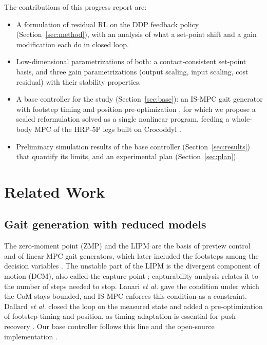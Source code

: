 \documentclass[conference]{IEEEtran}
\begin{document}
The contributions of this progress report are:
\begin{itemize}
\item A formulation of residual RL on the DDP feedback policy (Section~\ref{sec:method}), with an analysis of what a set-point shift and a gain modification each do in closed loop.
\item Low-dimensional parametrizations of both: a contact-consistent set-point basis, and three gain parametrizations (output scaling, input scaling, cost residual) with their stability properties.
\item A base controller for the study (Section~\ref{sec:base}): an IS-MPC gait generator \cite{scianca2020ismpc} with footstep timing and position pre-optimization \cite{dallard2025adios}, for which we propose a scaled reformulation solved as a single nonlinear program, feeding a whole-body MPC of the HRP-5P \cite{kaneko2019hrp5p} legs built on Crocoddyl \cite{mastalli2020crocoddyl}.
\item Preliminary simulation results of the base controller (Section~\ref{sec:results}) that quantify its limits, and an experimental plan (Section~\ref{sec:plan}).
\end{itemize}

\section{Related Work}

\subsection{Gait generation with reduced models}
The zero-moment point (ZMP) \cite{vukobratovic2004zmp} and the LIPM \cite{kajita2001lipm} are the basis of preview control \cite{kajita2003preview} and of linear MPC gait generators, which later included the footsteps among the decision variables \cite{wieber2006mpc,herdt2010online}.
The unstable part of the LIPM is the divergent component of motion (DCM), also called the capture point \cite{pratt2006capture,takenaka2009dcm,englsberger2011capture}; capturability analysis \cite{koolen2012capturability} relates it to the number of steps needed to stop.
Lanari \emph{et al.} \cite{lanari2014boundedness} gave the condition under which the CoM stays bounded, and IS-MPC \cite{scianca2020ismpc} enforces this condition as a constraint.
Dallard \emph{et al.} \cite{dallard2025adios} closed the loop on the measured state and added a pre-optimization of footstep timing and position, as timing adaptation is essential for push recovery \cite{khadiv2020timing}.
Our base controller follows this line and the open-source implementation \cite{ismpcwalking}.
\end{document}
